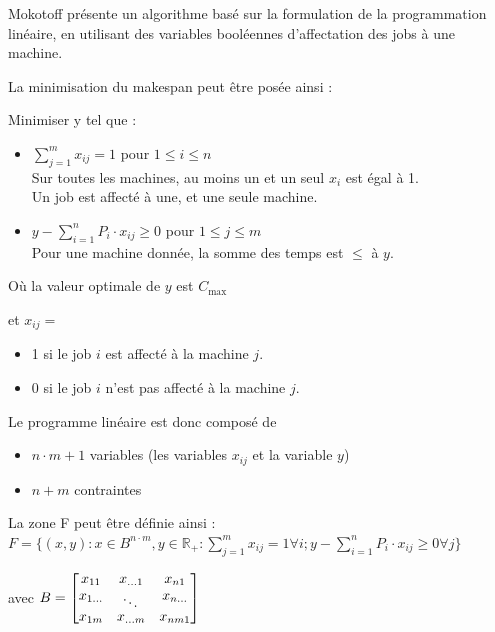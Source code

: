 \documentclass[a4paper,12pt]{report}
\theoremstyle{plain}				%
\theoremstyle{definition}				%
\newcommand{\tdi}[1]{\todo[inline]{{#1}}{}}
\begin{document}
Mokotoff \cite{mokoto1999scheduling} présente un algorithme basé sur la formulation de la programmation linéaire, en utilisant des variables booléennes d'affectation des jobs à une machine.

\tdi{LP: définir $x_{ij}$}
\bigskip
La minimisation du makespan peut être posée ainsi :

Minimiser y tel que :

\begin{itemize}
\item $\sum_{j=1}^{m}x_{ij}=1$ \quad pour $1 \leq i \leq n$ 		\\
Sur toutes les machines, au moins un et un seul $x_i$ est égal à 1.	\\
Un job est affecté à une, et une seule machine.

\item $y-\sum_{i=1}^{n}P_i \cdot x_{ij} \geq 0$ \quad pour $1 \leq j \leq m$ \\
Pour une machine donnée, la somme des temps est $\leq$ à $y$.
\end{itemize}

\bigskip
Où	\quad	la valeur optimale de $y$ est $C_{\max}$

et	\quad	$x_{ij} =$

\begin{itemize}
\item 1 si le job $i$ est affecté à la machine $j$.
\item 0 si le job $i$ n'est pas affecté à la machine $j$.
\end{itemize}

 \bigskip
 Le programme linéaire est donc composé de
 \begin{itemize}
 \item $n \cdot m + 1$ variables (les variables $x_{ij}$ et la variable $y$)
 \item $n+m$ contraintes
 \end{itemize}

\bigskip
La zone F peut être définie ainsi : \\
$F=\{ (x,y) : x \in B^{n \cdot m}, y \in \mathbb{R_+} : \sum_{j=1}^{m} x_{ij}=1 \forall i;
y-\sum_{i=1}^{n} P_i \cdot x_{ij} \geq 0 \forall j \}$

avec $B=\begin{bmatrix}
x_{11}&x_{\dots 1}&x_{n1}\\
x_{1 \dots}& \rotatebox{-30}{\dots}&x_{n \dots}\\
x_{1m}&x_{\dots m}&x_{nm1}
\end{bmatrix}$
\end{document}
